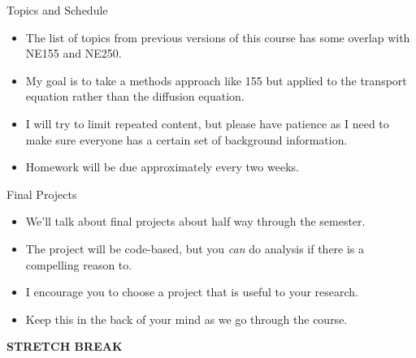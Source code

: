 \documentclass[xcolor=x11names,compress, handout]{beamer}
\renewcommand{\(}{\begin{columns}}
\renewcommand{\)}{\end{columns}}
\newcommand{\<}[1]{\begin{column}{#1}}
\renewcommand{\>}{\end{column}}
\begin{document}
\begin{frame}{Topics and Schedule}
\begin{itemize}
\item The list of topics from previous versions of this course has some overlap with NE155 and NE250.
\item My goal is to take a methods approach like 155 but applied to the transport equation rather than the diffusion equation.
\item I will try to limit repeated content, but please have patience as I need to make sure everyone has a certain set of background information.
\item Homework will be due approximately every two weeks.
\end{itemize}
\end{frame}


\begin{frame}{Final Projects}
\begin{itemize}
\item We'll talk about final projects about half way through the semester.
\item The project will be code-based, but you \textit{can} do analysis if there is a compelling reason to.
\item I encourage you to choose a project that is useful to your research.
\item Keep this in the back of your mind as we go through the course.
\end{itemize}

\pause
\vspace*{2em}
\begin{center}
\textbf{STRETCH BREAK}
\end{center}
\end{frame}
\end{document}
